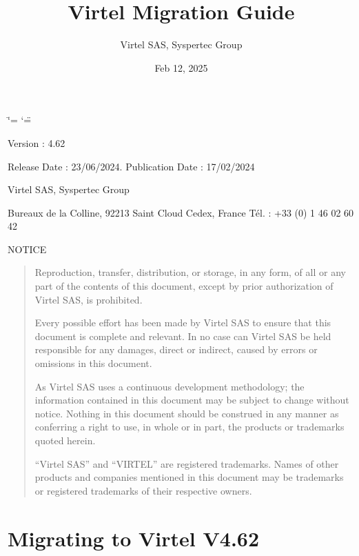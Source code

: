 \documentclass[letterpaper,10pt,english]{sphinxmanual}
\title{Virtel Migration Guide}
\date{Feb 12, 2025}
\author{Virtel SAS, Syspertec Group}
\begin{document}
\ifdefined\shorthandoff
  \ifnum\catcode`\=\string=\active\shorthandoff{=}\fi
  \ifnum\catcode`\"=\active{}\fi
\fi

\pagestyle{empty}
\sphinxmaketitle
\pagestyle{plain}
\sphinxtableofcontents
\pagestyle{normal}
\label{\detokenize{Migration_Guide::doc}}


\sphinxAtStartPar
{}

\sphinxAtStartPar
Version : 4.62

\sphinxAtStartPar
Release Date : 23/06/2024. Publication Date : 17/02/2024

\sphinxAtStartPar
Virtel SAS, Syspertec Group

 Bureaux de la Colline, 92213 Saint Cloud Cedex, France Tél. : +33 (0) 1 46 02 60 42

\sphinxAtStartPar
{}

\sphinxAtStartPar
NOTICE
\begin{quote}

\sphinxAtStartPar
Reproduction, transfer, distribution, or storage, in any form, of all or any part of
the contents of this document, except by prior authorization of Virtel SAS, is prohibited.

\sphinxAtStartPar
Every possible effort has been made by Virtel SAS to ensure that this document
is complete and relevant. In no case can Virtel SAS be held responsible for
any damages, direct or indirect, caused by errors or omissions in this document.

\sphinxAtStartPar
As Virtel SAS uses a continuous development methodology; the information
contained in this document may be subject to change without notice. Nothing in this
document should be construed in any manner as conferring a right to use, in whole or in
part, the products or trademarks quoted herein.

\sphinxAtStartPar
“Virtel SAS” and “VIRTEL” are registered trademarks. Names of other products
and companies mentioned in this document may be trademarks or registered trademarks of
their respective owners.
\end{quote}

\newpage

\ignorespaces 

\chapter{Migrating to Virtel V4.62}
\label{\detokenize{Migration_Guide:migrating-to-virtel-v4-62}}\label{\detokenize{Migration_Guide:v462mi-introduction}}\label{\detokenize{Migration_Guide:index-0}}
\end{document}
